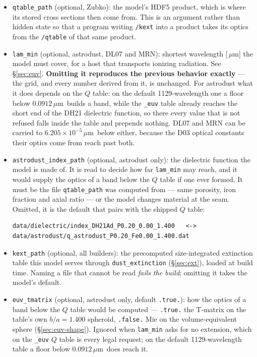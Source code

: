 \documentclass{my_memo}
\newcommand{\code}[1]{\texttt{#1}}
\newcommand{\um}{\ensuremath{\,\mu\mathrm{m}}}
\begin{document}
\begin{itemize}
      it is what the \code{ld01} keyword of the CLI drivers sets. Any other
      string is refused with \code{status = 8} rather than defaulted.
\item \code{qtable\_path} (optional, Zubko): the model's HDF5 product, which is
      where its stored cross sections then come from. This is an argument
      rather than hidden state so that a program writing \code{/kext} into a
      product takes its optics from the \code{/qtable} of that same product.
\item \code{lam\_min} (optional, astrodust, DL07 and MRN): shortest wavelength
      [\um] the model must cover, for a host that transports ionizing
      radiation. See \S\ref{sec:euv}. \textbf{Omitting it reproduces the previous
      behavior exactly} --- the grid, and every number derived from it, is
      unchanged. For astrodust what it does depends on the $Q$ table: on the
      default 1129-wavelength one a floor below $0.0912$\um\ builds a band,
      while the \code{\_euv} table already reaches the short end of the DH21
      dielectric function, so there every value that is not refused falls
      inside the table and prepends nothing. DL07 and MRN can be carried
      to $6.205\times10^{-5}$\um\ below either, because
      the D03 optical constants their optics come from reach past both.
\item \code{astrodust\_index\_path} (optional, astrodust only): the dielectric
      function the model is made of. It is read to decide how far
      \code{lam\_min} may reach, and it would supply the optics of a band below
      the $Q$ table if one ever formed. It must be the file
      \code{qtable\_path} was computed from --- same porosity, iron fraction and
      axial ratio --- or the model changes material at the seam. Omitted, it is
      the default that pairs with the shipped $Q$ table:
\begin{lstlisting}[style=sh]
data/dielectric/index_DH21Ad_P0.20_0.00_1.400   <->
data/astrodust/q_astrodust_P0.20_Fe0.00_1.400.dat
\end{lstlisting}
\item \code{kext\_path} (optional, all builders): the precomputed
      size-integrated extinction table this model serves through
      \code{dust\_extinction} (\S\ref{sec:ext}), loaded at build time. Naming a
      file that cannot be read \emph{fails the build}; omitting it takes the
      model's default.
\item \code{euv\_tmatrix} (optional, astrodust only, default \code{.true.}):
      how the optics of a band below the $Q$ table would be computed ---
      \code{.true.} the T-matrix on the table's own $b/a = 1.400$ spheroid,
      \code{.false.} Mie on the volume-equivalent sphere (\S\ref{sec:euv-shape}).
      Ignored when \code{lam\_min} asks for no extension, which on the
      \code{\_euv} $Q$ table is every legal request; on the default
      1129-wavelength table a floor below $0.0912$\um\ does reach it.
\end{itemize}
\end{document}
